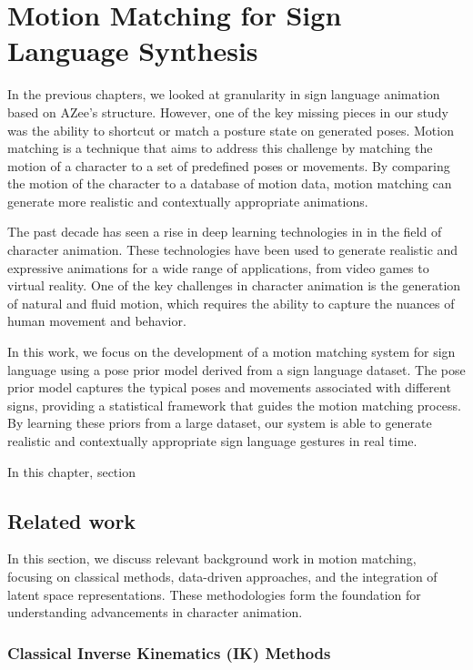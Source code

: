 \documentclass[../../main.tex]{subfiles}
\begin{document}
\chapter{Motion Matching for Sign Language Synthesis}
\label{ch:motion_matching}

In the previous chapters, we looked at granularity in sign language animation based on AZee's structure. However, one of the key missing pieces in our study was the ability to shortcut or match a posture state on generated poses. Motion matching is a technique that aims to address this challenge by matching the motion of a character to a set of predefined poses or movements. By comparing the motion of the character to a database of motion data, motion matching can generate more realistic and contextually appropriate animations.

The past decade has seen a rise in deep learning technologies in in the field of character animation. These technologies have been used to generate realistic and expressive animations for a wide range of applications, from video games to virtual reality. One of the key challenges in character animation is the generation of natural and fluid motion, which requires the ability to capture the nuances of human movement and behavior. 

In this work, we focus on the development of a motion matching system for sign language using a pose prior model derived from a sign language dataset. The pose prior model captures the typical poses and movements associated with different signs, providing a statistical framework that guides the motion matching process. By learning these priors from a large dataset, our system is able to generate realistic and contextually appropriate sign language gestures in real time.

In this chapter, section 

\section{Related work}
\label{ch:motion_matching:related_work}

In this section, we discuss relevant background work in motion matching, focusing on classical methods, data-driven approaches, and the integration of latent space representations. These methodologies form the foundation for understanding advancements in character animation.

\subsection{Classical Inverse Kinematics (IK) Methods}
\label{ch:motion_matching:related_work:classical_ik}
\end{document}

